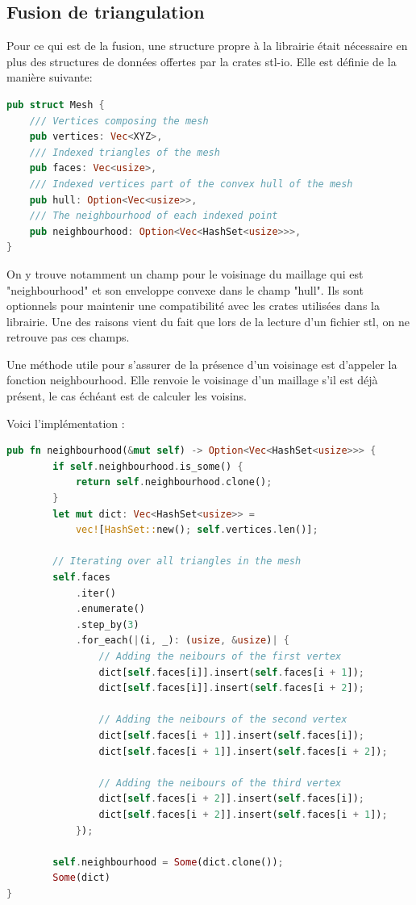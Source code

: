 \subsection{Fusion de triangulation}
Pour ce qui est de la fusion, une structure propre à la librairie était nécessaire en plus des structures de données offertes par la crates stl-io.
Elle est définie de la manière suivante:
\begin{lstlisting}[language=Rust, style=boxed]
pub struct Mesh {
    /// Vertices composing the mesh
    pub vertices: Vec<XYZ>,
    /// Indexed triangles of the mesh
    pub faces: Vec<usize>,
    /// Indexed vertices part of the convex hull of the mesh
    pub hull: Option<Vec<usize>>,
    /// The neighbourhood of each indexed point
    pub neighbourhood: Option<Vec<HashSet<usize>>>,
}
\end{lstlisting}

On y trouve notamment un champ pour le voisinage du maillage qui est "neighbourhood" et son enveloppe convexe dans le champ "hull".
Ils sont optionnels pour maintenir une compatibilité avec les crates utilisées dans la librairie.
Une des raisons vient du fait que lors de la lecture d'un fichier \gls{stl}, on ne retrouve pas ces champs. 

Une méthode utile pour s'assurer de la présence d'un voisinage est d'appeler la fonction neighbourhood. Elle renvoie le voisinage d'un maillage s'il est déjà présent, le cas échéant est de calculer les voisins.

Voici l'implémentation : 
\begin{lstlisting}[language=Rust, style=boxed]
pub fn neighbourhood(&mut self) -> Option<Vec<HashSet<usize>>> {
        if self.neighbourhood.is_some() {
            return self.neighbourhood.clone();
        }
        let mut dict: Vec<HashSet<usize>> = 
            vec![HashSet::new(); self.vertices.len()];

        // Iterating over all triangles in the mesh
        self.faces
            .iter()
            .enumerate()
            .step_by(3)
            .for_each(|(i, _): (usize, &usize)| {
                // Adding the neibours of the first vertex
                dict[self.faces[i]].insert(self.faces[i + 1]);
                dict[self.faces[i]].insert(self.faces[i + 2]);

                // Adding the neibours of the second vertex
                dict[self.faces[i + 1]].insert(self.faces[i]);
                dict[self.faces[i + 1]].insert(self.faces[i + 2]);

                // Adding the neibours of the third vertex
                dict[self.faces[i + 2]].insert(self.faces[i]);
                dict[self.faces[i + 2]].insert(self.faces[i + 1]);
            });

        self.neighbourhood = Some(dict.clone());
        Some(dict)
}
\end{lstlisting}

